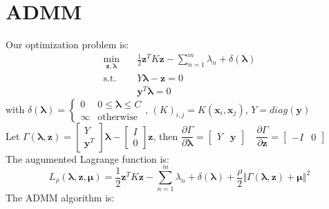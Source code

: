 \documentclass{article}
\begin{document}
\section{ADMM}
Our optimization problem is:
\begin{align*}
    \min\limits_{\mathbf{z},\boldsymbol{\lambda}}\quad&
    \frac{1}{2}\mathbf{z}^T K \mathbf{z} - 
    \sum\limits_{n=1}^m\lambda_n +
    \delta(\boldsymbol{\lambda})\\
    \text{s.t.}\quad& Y\boldsymbol{\lambda}-\mathbf{z}=0\\
    &\mathbf{y}^T \boldsymbol{\lambda}=0
\end{align*}
with $\delta(\boldsymbol{\lambda})=
    \begin{cases}
        0 &0\leq \boldsymbol{\lambda} \leq C\\
        \infty &\text{otherwise}
    \end{cases}$, 
$(K)_{i,j}=K(\mathbf{x}_i,\mathbf{x}_j)$, $Y=diag(\mathbf{y})$\\
Let $\Gamma(\boldsymbol{\lambda},\mathbf{z})=
    \begin{bmatrix}
        Y\\
        \mathbf{y}^T
    \end{bmatrix}
\boldsymbol{\lambda}-
    \begin{bmatrix}
        I\\
        0
    \end{bmatrix}
\mathbf{z}$, then 
$\dfrac{\partial\Gamma}{\partial\boldsymbol{\lambda}}=
    \begin{bmatrix}
        Y&\mathbf{y}
    \end{bmatrix}\quad
\dfrac{\partial\Gamma}{\partial\mathbf{z}}=
    \begin{bmatrix}
        -I&0
    \end{bmatrix}$\\
The augumented Lagrange function is:
    $$L_\rho(\boldsymbol{\lambda},\mathbf{z},\boldsymbol{\mu})=
    \frac{1}{2}\mathbf{z}^T K \mathbf{z} - 
    \sum\limits_{n=1}^m\lambda_n +
    \delta(\boldsymbol{\lambda}) +
    \frac{\rho}{2} \Vert \Gamma(\boldsymbol{\lambda},\mathbf{z})+\boldsymbol{\mu} \Vert^2$$
The ADMM algorithm is:
\end{document}
